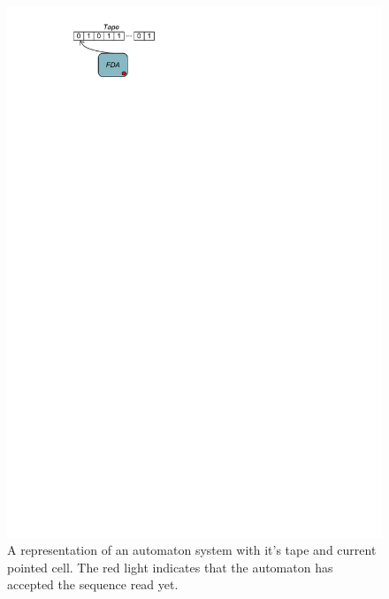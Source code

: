 \begin{figure}[h]
\begin{center}
  \includegraphics[scale=1, trim=3.5cm 25.4cm 12.4cm 0.6cm,
  clip]{imgs/automaton_representation.pdf}
  \caption{A representation of an automaton system with it's tape and current pointed cell. The red light indicates that the automaton has accepted the sequence read yet.}
  \label{fig:automaton_representation}
\end{center}
\end{figure}

